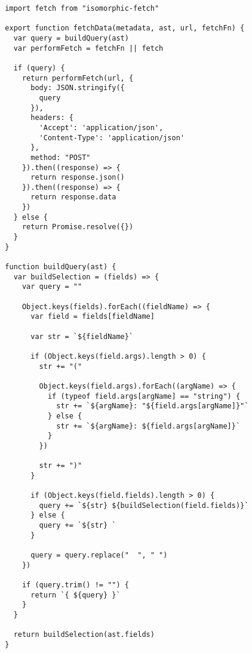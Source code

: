 \begin{verbatim}
  import fetch from "isomorphic-fetch"

  export function fetchData(metadata, ast, url, fetchFn) {
    var query = buildQuery(ast)
    var performFetch = fetchFn || fetch

    if (query) {
      return performFetch(url, {
        body: JSON.stringify({
          query
        }),
        headers: {
          'Accept': 'application/json',
          'Content-Type': 'application/json'
        },
        method: "POST"
      }).then((response) => {
        return response.json()
      }).then((response) => {
        return response.data
      })
    } else {
      return Promise.resolve({})
    }
  }

  function buildQuery(ast) {
    var buildSelection = (fields) => {
      var query = ""

      Object.keys(fields).forEach((fieldName) => {
        var field = fields[fieldName]

        var str = `${fieldName}`

        if (Object.keys(field.args).length > 0) {
          str += "("

          Object.keys(field.args).forEach((argName) => {
            if (typeof field.args[argName] == "string") {
              str += `${argName}: "${field.args[argName]}"`
            } else {
              str += `${argName}: ${field.args[argName]}`
            }
          })

          str += ")"
        }

        if (Object.keys(field.fields).length > 0) {
          query += `${str} ${buildSelection(field.fields)}`
        } else {
          query += `${str} `
        }

        query = query.replace("  ", " ")
      })

      if (query.trim() != "") {
        return `{ ${query} }`
      }
    }

    return buildSelection(ast.fields)
  }
\end{verbatim}
